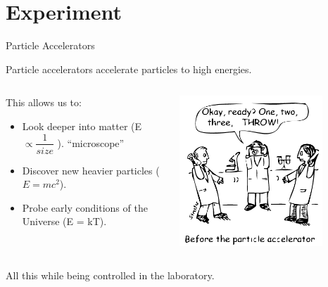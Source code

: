 \section{Experiment}

\begin{frame}{Particle Accelerators}
\begin{center}
Particle accelerators accelerate particles to high energies.
\begin{columns}
  \begin{column}{0.4\textwidth}
This allows us to:
    \begin{itemize}
    \item
      Look deeper into matter (E $\propto \dfrac{1}{size}$ ). ``microscope''
    \item
      Discover new heavier particles ($E = mc^{2}$).
    \item
      Probe early conditions of the Universe (E = kT).
    \end{itemize}
  \end{column}
  \begin{column}{0.6\textwidth}
    \begin{center}
    \includegraphics[width=0.79\textwidth]{images/before_accelerators.png}
    \end{center}
  \end{column}
\end{columns}
All this while being controlled in the laboratory.
\end{center}
\end{frame}



